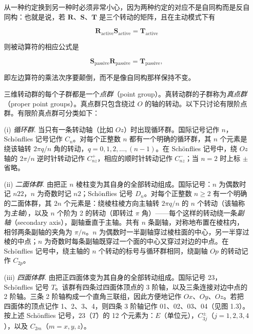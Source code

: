从一种约定换到另一种时必须非常小心，因为两种约定的对应不是自同构而是反自同构：也就是说，若 $\mathbf{R}$、$\mathbf{S}$、$\mathbf{T}$ 是三个转动的矩阵，且在主动模式下有

\begin{equation*}
\mathbf{R}_{\mathrm{active}}\mathbf{S}_{\mathrm{active}} = \mathbf{T}_{\mathrm{active}}
\tag{1.4.4}
\end{equation*}

则被动算符的相应公式是

\begin{equation*}
\mathbf{S}_{\mathrm{passive}}\mathbf{R}_{\mathrm{passive}} = \mathbf{T}_{\mathrm{passive}},
\tag{1.4.5}
\end{equation*}

即左边算符的乘法次序要颠倒，而不是像自同构那样保持不变。

三维转动群的每个子群都是一个\textit{点群}（point group）。真转动群的子群称为\textit{真点群}（proper point groups）。真点群只包含绕过 $O$ 的轴的转动。以下只讨论有限阶点群。有限阶真点群可分类如下：

(i) \textit{循环群}. 当只有一条转动轴（比如 $Oz$）时出现循环群。国际记号记作 $n$，Schönflies 记号记作 $C_{n}$。对每个正整数 $n$ 都有一个明确的循环群，其 $n$ 个元素是绕该轴转 $2\pi q/n$ 角的转动，$q = 0, 1, 2, \ldots, (n-1)$。在 Schönflies 记号中，绕 $Oz$ 轴的 2$\pi/n$ 逆时针转动记作 $C_{nz}^{+}$，相应的顺时针转动记作 $C_{nz}^{-}$；当 $n = 2$ 时上标 $\pm$ 省略。

(ii) \textit{二面体群}. 由把正 $n$ 棱柱变为其自身的全部转动组成。国际记号：$n$ 为偶数时记 $n22$，$n$ 为奇数时记 $n2$；Schönflies 记号 $D_{n}$。对每个正整数 $n \geqslant 2$ 有一个明确的二面体群，其 $2n$ 个元素是：绕棱柱棱方向主轴转 $2\pi q/n$ 的 $n$ 个转动（该轴称为\textit{主轴}），以及 $n$ 个阶为 2 的转动（即转过 $\pi$ 角）——每个这样的转动绕一条\textit{副轴}（secondary axis），副轴垂直于主轴。共有 $n$ 条副轴，对称地布置在棱柱内，相邻两条副轴的夹角为 $\pi/n$。$n$ 为偶数时一半副轴穿过棱柱面的中心，另一半穿过棱的中点；$n$ 为奇数时每条副轴既穿过一个面的中心又穿过对边的中点。在 Schönflies 记号中，绕主轴的 $n$ 个转动的标号与循环群相同，绕副轴 $Op$ 的转动记作 $C_{2p}$。

(iii) \textit{四面体群}. 由把正四面体变为其自身的全部转动组成。国际记号 23，Schönflies 记号 $T$。该群有四条过四面体顶点的 3 阶轴，以及三条连接对边中点的 2 阶轴。三条 2 阶轴构成一个直角三联组，因此方便地记作 $Ox$、$Oy$、$Oz$。若把四面体的顶点记作 1、2、3、4，则四条 3 阶轴记作 01、02、03、04（见图 1.3）。按上述 Schönflies 记号，23（$T$）的 12 个元素为：$E$（单位元），$C_{3j}^{\pm}$（$j = 1, 2, 3, 4$），以及 $C_{2m}$（$m = x, y, z$）。

